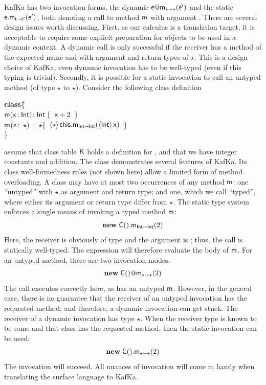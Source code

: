 \documentclass[a4paper,USenglish]{lipics-v2018}
\makeatletter
\newcommand{\HS}{\hspace{.2cm}}
\newcommand{\EM}[1]{\ensuremath{#1}\xspace}
\newcommand{\xt}[1]{{\sf{#1}}}
\newcommand{\bt}[1]{\xt{\bf #1}}
\newcommand{\EMxt}[1]{\EM{\xt{#1}}}
\newcommand{\x}{\EMxt x}
\newcommand{\m}{\EMxt m}
\newcommand{\K}{\EMxt K}
\newcommand{\any}{\EM{\star}}
\newcommand{\this}{\EMxt{this}}
\newcommand{\KCall}[5]{\EM{{#1}.{#2}_{{#4} \shortrightarrow {#5}}(#3)}}
\newcommand{\DynCall}[3]{\EM{#1@#2_{\any\shortrightarrow\any}(#3)}}
\newcommand{\New}[2]{\EM{\new\;#1(#2)}}
\newcommand{\SubCast}[2]{\EM{\langle{#1}\rangle\,{#2}}}
\newcommand{\new}{\EM{\bt{new}}}
\newcommand{\HT}[2]{\EM{{#1}\!:{#2}}}
\newcommand{\Mdef}[5]{\EM{ \HT{ #1( \HT{#2}{#3})}{#4}\;\{{#5}\}}}
\newcommand{\class}{\EM{\bf{class}}}
\newcommand{\kafka}{{\sf KafKa}\xspace}
\newcounter{rules}
\newcounter{conds}
\newcounter{cond}[conds]
\newcommand{\Int}{\xt{Int}}
\makeatother
\begin{document}
\kafka has two invocation forms, the dynamic \DynCall\e\m\ep and the static
\KCall\e\m\ep\t\tp, both denoting a call to method \m with argument \ep.
There are several design issues worth discussing. First, as our calculus is
a translation target, it is acceptable to require some explicit preparation
for objects to be used in a dynamic context. A dynamic call is only
successful if the receiver has a method of the expected name and with
argument and return types of \any. This is a design choice of \kafka, even
dynamic invocation has to be well-typed (even if this typing is
trivial). Secondly, it is possible for a static invocation to call an untyped
method (of type \any to \any).
Consider the following
class definition

\begin{tabbing}
\small\hspace{1.5em}\class \C \=\{\\
\>\HS\HS\Mdef\m\x\Int\Int{\HS\x+2\HS}\\
\>\HS\HS\=\m(\x:~\any)~:~\any\{~\SubCast\any{\KCall\this\m{\SubCast\Int\x}\Int\Int}~\}\\
\> \}
\end{tabbing}
assume that class table \K holds a definition for \Int, and that we have
integer constants and addition.
The class demonstrates several features of \kafka. Its class
well-formedness rules (not shown here) allow a limited form of method
overloading. A class may have at most two occurrences of any method \m: one 
``untyped'' with \any as argument and return type; and one,
which we call ``typed'', where either its argument or return type differ from \any.
The static type system enforces a single means of invoking a typed method
\m:
\[\KCall{\New\C{}}\m{2}\Int\Int\] 
Here, the receiver is obviously of type \C and the argument is \Int; thus, the
call is statically well-typed. The expression will therefore 
evaluate the body of \m. For an untyped method, there are two invocation
modes:
\[\DynCall{\New\C{}}\m{2}\]
The call executes correctly here, as \C has an untyped \m. However,
in the general case, there is no guarantee that the receiver of an untyped
invocation has the requested method; and therefore, a dynamic invocation can
get stuck. The receiver of a dynamic invocation has type \any. When the
receiver type is known to be some \C and that class has the requested method,
then the static invocation can be used:
\[\KCall{\New\C{}}\m{2}\any\any\]
The invocation will succeed. All nuances of invocation
will come in handy when translating the surface language to \kafka.
\end{document}

